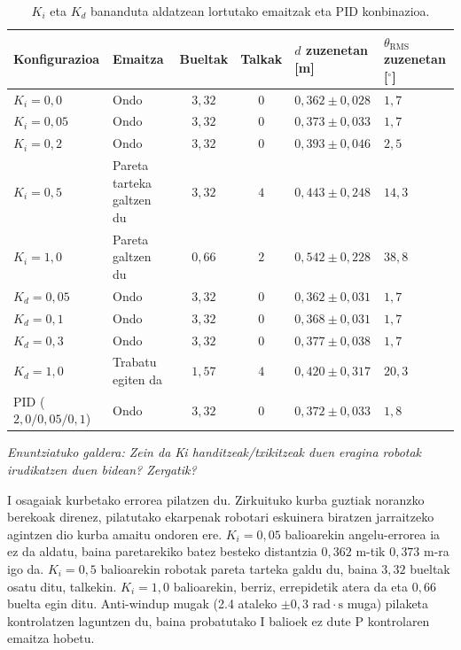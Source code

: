 \begin{table}[H]
\centering\footnotesize
\renewcommand{\arraystretch}{0.76}
\begin{tabularx}{\textwidth}{@{} l >{\raggedright\arraybackslash}X c c >{\centering\arraybackslash}p{2.6cm} >{\centering\arraybackslash}p{2.3cm} @{}}
\toprule
\textbf{Konfigurazioa} & \textbf{Emaitza} & \textbf{Bueltak} & \textbf{Talkak} & \textbf{$d$ zuzenetan [m]} & \textbf{$\theta_{\text{RMS}}$ zuzenetan [$^\circ$]} \\
\midrule
$K_i = 0{,}0$  & Ondo                    & $3{,}32$ & $0$ & $0{,}362 \pm 0{,}028$ & $1{,}7$ \\
$K_i = 0{,}05$ & Ondo                    & $3{,}32$ & $0$ & $0{,}373 \pm 0{,}033$ & $1{,}7$ \\
$K_i = 0{,}2$  & Ondo                    & $3{,}32$ & $0$ & $0{,}393 \pm 0{,}046$ & $2{,}5$ \\
$K_i = 0{,}5$  & Pareta tarteka galtzen du & $3{,}32$ & $4$ & $0{,}443 \pm 0{,}248$ & $14{,}3$ \\
$K_i = 1{,}0$  & Pareta galtzen du       & $0{,}66$ & $2$ & $0{,}542 \pm 0{,}228$ & $38{,}8$ \\
\midrule
$K_d = 0{,}05$ & Ondo                    & $3{,}32$ & $0$ & $0{,}362 \pm 0{,}031$ & $1{,}7$ \\
$K_d = 0{,}1$  & Ondo                    & $3{,}32$ & $0$ & $0{,}368 \pm 0{,}031$ & $1{,}7$ \\
$K_d = 0{,}3$  & Ondo                    & $3{,}32$ & $0$ & $0{,}377 \pm 0{,}038$ & $1{,}7$ \\
$K_d = 1{,}0$  & Trabatu egiten da       & $1{,}57$ & $4$ & $0{,}420 \pm 0{,}317$ & $20{,}3$ \\
\midrule
PID ($2{,}0/0{,}05/0{,}1$) & Ondo        & $3{,}32$ & $0$ & $0{,}372 \pm 0{,}033$ & $1{,}8$ \\
\bottomrule
\end{tabularx}
\caption{$K_i$ eta $K_d$ bananduta aldatzean lortutako emaitzak eta PID konbinazioa.}\label{tab:pid-sweep}
\end{table}

\noindent\textit{Enuntziatuko galdera: Zein da Ki handitzeak/txikitzeak duen eragina robotak irudikatzen duen bidean? Zergatik?}\par\vspace{2pt}

I osagaiak kurbetako errorea pilatzen du. Zirkuituko kurba guztiak noranzko berekoak direnez, pilatutako ekarpenak robotari eskuinera biratzen jarraitzeko agintzen dio kurba amaitu ondoren ere. $K_i = 0{,}05$ balioarekin angelu-errorea ia ez da aldatu, baina paretarekiko batez besteko distantzia $0{,}362\text{ m}$-tik $0{,}373\text{ m}$-ra igo da. $K_i = 0{,}5$ balioarekin robotak pareta tarteka galdu du, baina $3{,}32$ bueltak osatu ditu, talkekin. $K_i = 1{,}0$ balioarekin, berriz, errepidetik atera da eta $0{,}66$ buelta egin ditu. Anti-windup mugak (2.4 ataleko $\pm 0{,}3\text{ rad}\cdot\text{s}$ muga) pilaketa kontrolatzen laguntzen du, baina probatutako I balioek ez dute P kontrolaren emaitza hobetu.

